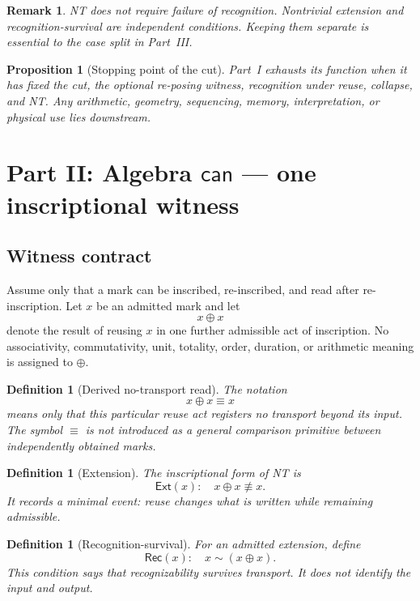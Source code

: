 \documentclass[11pt,letterpaper]{article}
\theoremstyle{constraintstyle}
\newtheorem{proposition}[theorem]{Proposition}
\newtheorem{definition}[theorem]{Definition}
\newtheorem{remark}[theorem]{Remark}
\newcommand{\Can}{\mathsf{can}}
\newcommand{\Ext}{\mathsf{Ext}}
\newcommand{\Rec}{\mathsf{Rec}}
\begin{document}
\begin{remark}
NT does not require failure of recognition.  Nontrivial extension and recognition-survival are independent conditions.  Keeping them separate is essential to the case split in Part~III.
\end{remark}

\begin{proposition}[Stopping point of the cut]
Part~I exhausts its function when it has fixed the cut, the optional re-posing witness, recognition under reuse, collapse, and NT.  Any arithmetic, geometry, sequencing, memory, interpretation, or physical use lies downstream.
\end{proposition}

\section{Part II: Algebra \texorpdfstring{$\Can$}{can} --- one inscriptional witness}\label{sec:algebra}

\subsection{Witness contract}

Assume only that a mark can be inscribed, re-inscribed, and read after re-inscription.  Let $x$ be an admitted mark and let
\[
x\oplus x
\]
denote the result of reusing $x$ in one further admissible act of inscription.  No associativity, commutativity, unit, totality, order, duration, or arithmetic meaning is assigned to $\oplus$.

\begin{definition}[Derived no-transport read]
The notation
\[
x\oplus x\equiv x
\]
means only that this particular reuse act registers no transport beyond its input.  The symbol $\equiv$ is not introduced as a general comparison primitive between independently obtained marks.
\end{definition}

\begin{definition}[Extension]
The inscriptional form of NT is
\[
\Ext(x):\quad x\oplus x\not\equiv x.
\]
It records a minimal event: reuse changes what is written while remaining admissible.
\end{definition}

\begin{definition}[Recognition-survival]
For an admitted extension, define
\[
\Rec(x):\quad x\sim(x\oplus x).
\]
This condition says that recognizability survives transport.  It does not identify the input and output.
\end{definition}
\end{document}
